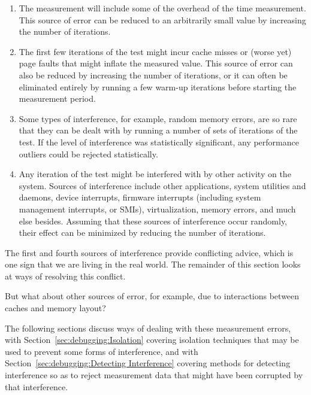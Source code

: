 \begin{enumerate}
\item	The measurement will include some of the overhead of
	the time measurement.
	This source of error can be reduced to an arbitrarily small
	value by increasing the number of iterations.
\item	The first few iterations of the test might incur cache misses
	or (worse yet) page faults that might inflate the measured
	value.
	This source of error can also be reduced by increasing the
	number of iterations, or it can often be eliminated entirely
	by running a few warm-up iterations before starting the
	measurement period.
\item	Some types of interference, for example, random memory errors,
	are so rare that they can be dealt with by running a number
	of sets of iterations of the test.
	If the level of interference was statistically significant,
	any performance outliers could be rejected statistically.
\item	Any iteration of the test might be interfered with by other
	activity on the system.
	Sources of interference include other applications, system
	utilities and daemons, device interrupts, firmware interrupts
	(including system management interrupts, or SMIs),
	virtualization, memory errors, and much else besides.
	Assuming that these sources of interference occur randomly,
	their effect can be minimized by reducing the number of
	iterations.
\end{enumerate}

The first and fourth sources of interference provide conflicting advice,
which is one sign that we are living in the real world.
The remainder of this section looks at ways of resolving this conflict.

\QuickQuiz{}
	But what about other sources of error, for example, due to
	interactions between caches and memory layout?
 \QuickQuizEnd

The following sections discuss ways of dealing with these measurement
errors, with
Section~\ref{sec:debugging:Isolation}
covering isolation techniques that may be used to prevent some forms of
interference,
and with
Section~\ref{sec:debugging:Detecting Interference}
covering methods for detecting interference so as to reject measurement
data that might have been corrupted by that interference.

